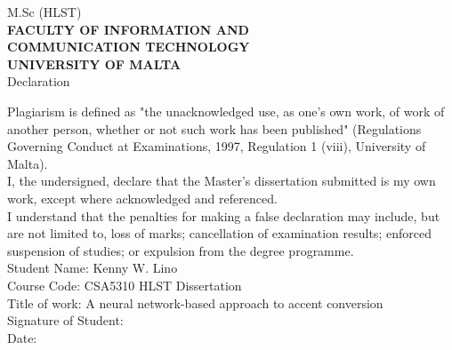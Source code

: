 \cleardoublepage

\begin{center}
  M.Sc (HLST) \\
  \uppercase{\textbf{Faculty of Information and \\
  Communication Technology \\ University of Malta \\ }}
  \vspace*{0.5cm}
  Declaration \\
\end{center}
  \vspace*{1.5cm}
        Plagiarism is defined as "the unacknowledged use, as one's own work, of work of another person, whether or not such work has been published" (Regulations Governing Conduct at Examinations, 1997, Regulation 1 (viii), University of Malta). \\

I, the undersigned, declare that the Master's dissertation submitted is my own work, except where acknowledged and referenced. \\

I understand that the penalties for making a false declaration may include, but are not limited to, loss of marks; cancellation of examination results; enforced suspension of studies; or expulsion from the degree programme. \\
       
       \vspace*{1.5cm}
	     Student Name: Kenny W. Lino \\
       Course Code: CSA5310 HLST Dissertation \\
       Title of work: A neural network-based approach to accent conversion \\

       \vspace*{1.0cm}
       Signature of Student: \\

       \vspace*{1.0cm}
       Date:

\newpage
